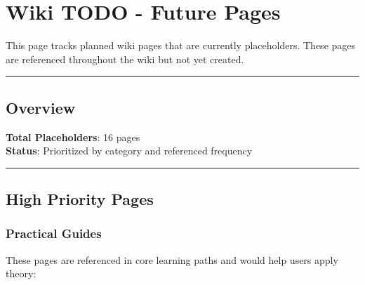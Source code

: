 \section{Wiki TODO - Future Pages}\label{wiki-todo---future-pages}

This page tracks planned wiki pages that are currently placeholders.
These pages are referenced throughout the wiki but not yet created.

\begin{center}\rule{0.5\linewidth}{0.5pt}\end{center}

\subsection{\texorpdfstring{ Overview}{ Overview}}\label{overview}

\textbf{Total Placeholders}: 16 pages\\
\textbf{Status}: Prioritized by category and referenced frequency

\begin{center}\rule{0.5\linewidth}{0.5pt}\end{center}

\subsection{\texorpdfstring{ High Priority
Pages}{ High Priority Pages}}\label{high-priority-pages}

\subsubsection{Practical Guides}\label{practical-guides}

These pages are referenced in core learning paths and would help users
apply theory:

